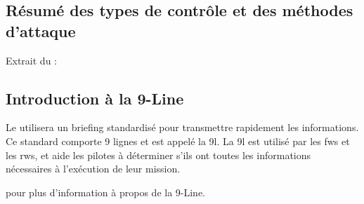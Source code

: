 \begin{minipage}{\textwidth}
	\subsection{Résumé des types de contrôle et des méthodes d'attaque}
	\begin{e1}
		\item
		Extrait du \jp: \\
		\vskip2mm
	\end{e1}
\end{minipage}


\subsection{Introduction à la 9-Line}

Le \ja{} utilisera un briefing standardisé pour transmettre rapidement les informations. Ce standard comporte 9 lignes et est appelé la \gls{9l}. La \gls{9l} est utilisé par les \glspl{fw} et les \glspl{rw}, et aide les pilotes à déterminer s'ils ont toutes les informations nécessaires à l'exécution de leur mission.

 pour plus d'information à propos de la 9-Line.

